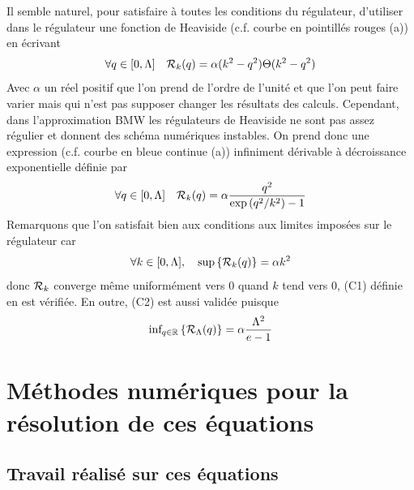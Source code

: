 \documentclass[10pt]{article}
\begin{document}
\begin{multicols}{2}
Il semble naturel, pour satisfaire à toutes les conditions  du régulateur, d'utiliser dans le régulateur une fonction de Heaviside (c.f. courbe en pointillés rouges  (a)) en écrivant 
\begin{equation}
	\forall q \in [0, \Lambda] \quad \mathcal{R}_k(q) = \alpha (k^2 - q^2) \Theta(k^2 - q^2)
	\label{eq:RegHeav}
\end{equation}
Avec $\alpha$ un réel positif que l'on prend de l'ordre de l'unité et que l'on peut faire varier mais qui n'est pas supposer changer les résultats des calculs. Cependant, dans l'approximation BMW les régulateurs de Heaviside ne sont pas assez régulier et donnent des schéma numériques instables. On prend donc une expression (c.f. courbe en bleue continue  (a)) infiniment dérivable à décroissance exponentielle définie par
\begin{equation}
	\forall q \in [0, \Lambda] \quad \mathcal{R}_k(q) = \alpha \frac{q^2}{\exp{(q^2/k^2)}-1}
	\label{eq:RegExp}
\end{equation}
Remarquons que l'on satisfait bien aux conditions aux limites imposées sur le régulateur car 
\begin{equation}
	\forall k \in [0,\Lambda],  \quad \text{sup} \left\{ \mathcal{R}_k(q) \right\} = \alpha k^2
\end{equation}
donc $\mathcal{R}_k$ converge même uniformément vers 0 quand $k$ tend vers 0, (C1) définie en  est vérifiée. En outre, (C2) est aussi validée puisque
\begin{equation}
	 \text{inf}_{q \in \mathbb{R}} \left\{ \mathcal{R}_\Lambda(q) \right\} = \alpha \frac{\Lambda^2}{e-1}
\end{equation}



\section{Méthodes numériques pour la résolution de ces équations}

\subsection{Travail réalisé sur ces équations}





\end{multicols}
\end{document}
